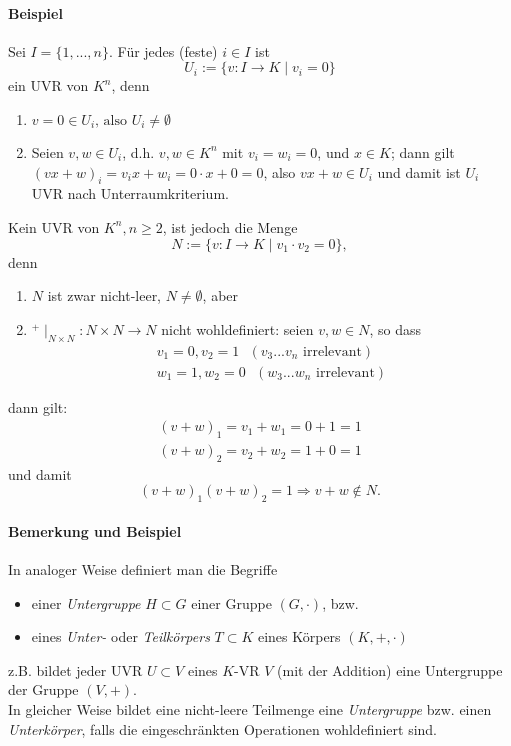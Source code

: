  	\paragraph{Beispiel}
 		Sei $I=\{1,...,n\}$. Für jedes (feste) $i\in I$ ist
 		\[
 			U_i := \{v:I\to K\mid v_i =0\}
 		\]
 		ein UVR von $K^n$, denn
 		\begin{enumerate}
 			\item $v = 0 \in U_i\text{, also } U_i \neq \emptyset$
 			\item Seien $v,w\in U_i$, d.h. $v,w\in K^n$ mit $v_i =w_i =0$, und $x\in K$; dann gilt $(vx+w)_i = v_ix+ w_i = 0\cdot x + 0 = 0$, also $vx+w\in U_i$ und damit ist $U_i$ UVR nach Unterraumkriterium.
 		\end{enumerate}
 		Kein UVR von $K^n, n\geq 2$, ist jedoch die Menge
 		\[
 			N:=\{v:I\to K\mid v_1\cdot v_2 = 0\},
 		\]
 		denn
 		\begin{enumerate}
 			\item $N$ ist zwar nicht-leer, $N\neq \emptyset$, aber
 			\item $^+\mid_{N\times N}: N\times N\to N$ nicht wohldefiniert: seien $v,w\in N$, so dass
 			      \begin{gather*}
 			      	v_1=0, v_2=1\text{ }(v_3 ... v_n \text{ irrelevant})\\
 			      	w_1=1, w_2 = 0\text{ }(w_3 ... w_n \text{ irrelevant})
 			      \end{gather*}
 		\end{enumerate}
 		dann gilt:
 		\begin{gather*}
 			(v+w)_1 = v_1 + w_1 = 0+1=1\\
 			(v+w)_2 = v_2 + w_2 = 1+0 = 1
 		\end{gather*}
 		und damit
 		\[
 			(v+w)_1(v+w)_2 = 1 \Rightarrow v+w\notin N.
 		\]

 	\paragraph{Bemerkung und Beispiel}
 		In analoger Weise definiert man die Begriffe
 		\begin{itemize}
 			\item einer \emph{Untergruppe} $H\subset G$ einer Gruppe $(G,\cdot)$, bzw.
 			\item eines \emph{Unter-} oder \emph{Teilkörpers} $T\subset K$ eines Körpers $(K,+,\cdot )$
 		\end{itemize}

 		z.B. bildet jeder UVR $U\subset V$ eines $K$-VR $V$ (mit der Addition) eine Untergruppe der Gruppe $(V,+)$.\\
 		In gleicher Weise bildet eine nicht-leere Teilmenge eine \emph{Untergruppe} bzw. einen \emph{Unterkörper}, falls die eingeschränkten Operationen wohldefiniert sind.

